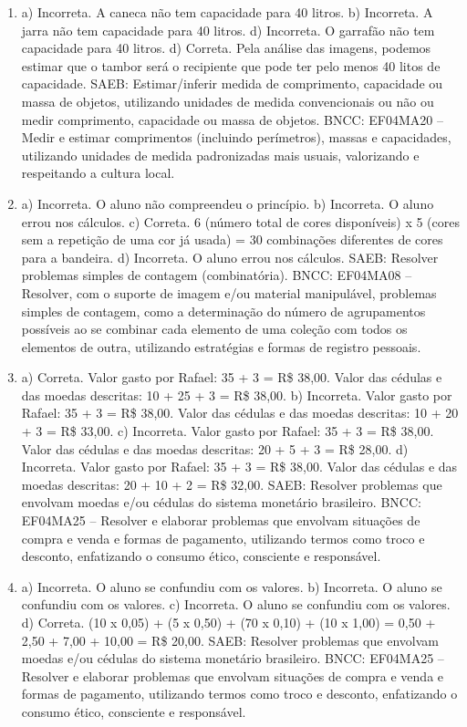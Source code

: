 \begin{enumerate}
\item
a) Incorreta. A caneca não tem capacidade para 40 litros.
b) Incorreta. A jarra não tem capacidade para 40 litros.
d) Incorreta. O garrafão não tem capacidade para 40 litros.
d) Correta. Pela análise das imagens, podemos estimar que o tambor será o recipiente que
pode ter pelo menos 40 litos de capacidade.
SAEB: Estimar/inferir medida de comprimento, capacidade ou
massa de objetos, utilizando unidades de medida convencionais ou não ou
medir comprimento, capacidade ou massa de objetos.
BNCC: EF04MA20 -- Medir e estimar comprimentos (incluindo perímetros), massas e capacidades, utilizando
unidades de medida padronizadas mais usuais, valorizando e respeitando a cultura local.

\item
a) Incorreta. O aluno não compreendeu o princípio.
b) Incorreta. O aluno errou nos cálculos.
c) Correta. 6 (número total de cores disponíveis) x 5 (cores sem a repetição de uma cor já usada) = 30 combinações diferentes de cores para a bandeira.
d) Incorreta. O aluno errou nos cálculos.
SAEB: Resolver problemas simples de contagem (combinatória).
BNCC: EF04MA08 -- Resolver, com o suporte de imagem e/ou material manipulável, problemas simples
de contagem, como a determinação do número de agrupamentos possíveis ao se combinar cada
elemento de uma coleção com todos os elementos de outra, utilizando estratégias e formas de
registro pessoais.

\item
a) Correta. Valor gasto por Rafael: 35 + 3 = R\$ 38,00. Valor das cédulas e das moedas descritas: 10 + 25 + 3 = R\$ 38,00.
b) Incorreta. Valor gasto por Rafael: 35 + 3 = R\$ 38,00. Valor das cédulas e das moedas descritas: 10 + 20 + 3 = R\$ 33,00.
c) Incorreta. Valor gasto por Rafael: 35 + 3 = R\$ 38,00. Valor das cédulas e das moedas descritas: 20 + 5 + 3 = R\$ 28,00.
d) Incorreta. Valor gasto por Rafael: 35 + 3 = R\$ 38,00. Valor das cédulas e das moedas descritas: 20 + 10 + 2 = R\$ 32,00.
SAEB: Resolver problemas que envolvam moedas e/ou cédulas do
sistema monetário brasileiro.
BNCC: EF04MA25 -- Resolver e elaborar problemas que envolvam situações de compra e venda e formas
de pagamento, utilizando termos como troco e desconto, enfatizando o consumo ético, consciente e
responsável.

\item
a) Incorreta. O aluno se confundiu com os valores.
b) Incorreta. O aluno se confundiu com os valores.
c) Incorreta. O aluno se confundiu com os valores.
d) Correta. (10 x 0,05) + (5 x 0,50) + (70 x 0,10) + (10 x 1,00) = 0,50 + 2,50 + 7,00 + 10,00 = R\$ 20,00.
SAEB: Resolver problemas que envolvam moedas e/ou cédulas do
sistema monetário brasileiro.
BNCC: EF04MA25 -- Resolver e elaborar problemas que envolvam situações de compra e venda e formas
de pagamento, utilizando termos como troco e desconto, enfatizando o consumo ético, consciente e
responsável.


\end{enumerate}
